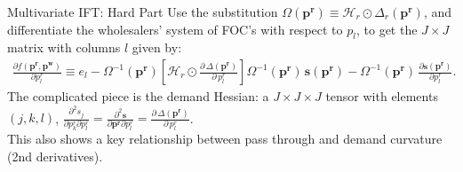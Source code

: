 \begin{frame}{Multivariate IFT: Hard Part}
Use the substitution $\Omega(\mathbf{p^r}) \equiv \mathcal{H}_r \odot \Delta_{r}(\mathbf{p^r})$, and differentiate the wholesalers' system of FOC's with respect to $p_l$, to get the $J \times J$ matrix with columns $l$ given by:
\begin{align}
\frac{\partial f(\mathbf{p^r},\mathbf{p^w})}{\partial p_l^r} \equiv e_l - \Omega^{-1}(\mathbf{p^r})
\left[  \mathcal{H}_{r} \odot \frac{\partial\, \Delta(\mathbf{p^r})}{\partial\, p_l^r} \right]
\Omega^{-1}(\mathbf{p^r})\,
\mathbf{s}(\mathbf{p^r}) -\Omega^{-1}(\mathbf{p^r})\, \frac{\partial \mathbf{s}(\mathbf{p^r})}{\partial p_l^r}.
\end{align}
The complicated piece is the demand Hessian: a $J \times J \times J$ tensor with elements $(j,k,l)$, $\frac{\partial^2 s_j}{\partial p_k^r \partial p_l^r} = \frac{\partial^2 \mathbf{s}}{\partial \mathbf{p^r} \partial p_l^r}=\frac{\partial\, \Delta(\mathbf{p^r})}{\partial\, p_l^r}$.\\

This also shows a key relationship between \alert{pass through} and \alert{demand curvature} (2nd derivatives).
\end{frame}



